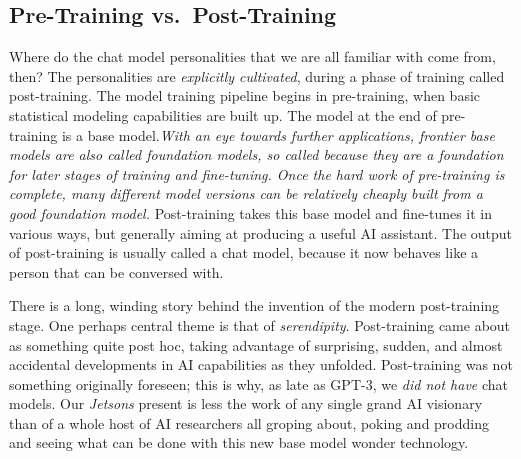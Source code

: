 \subsection{Pre-Training vs.\ Post-Training}
Where do the chat model personalities that we are all familiar with come from,
then? The personalities are \emph{explicitly cultivated}, during a phase of
training called post-training. The model training pipeline begins in
pre-training, when basic statistical modeling capabilities are built up. The
model at the end of pre-training is a base model.\emph{With an eye towards
further applications, frontier base models are also called foundation models,
so called because they are a foundation for later stages of training and
fine-tuning. Once the hard work of pre-training is complete, many different
model versions can be relatively cheaply built from a good foundation model.}
Post-training takes this base model and fine-tunes it in various ways, but
generally aiming at producing a useful AI assistant. The output of
post-training is usually called a chat model, because it now behaves like a
person that can be conversed with.

There is a long, winding story behind the invention of the modern post-training
stage. One perhaps central theme is that of \emph{serendipity}. Post-training
came about as something quite post hoc, taking advantage of surprising, sudden,
and almost accidental developments in AI capabilities as they unfolded.
Post-training was not something originally foreseen; this is why, as late as
GPT-3, we \emph{did not have} chat models. Our \emph{Jetsons} present is less
the work of any single grand AI visionary than of a whole host of AI
researchers all groping about, poking and prodding and seeing what can be done
with this new base model wonder technology.

